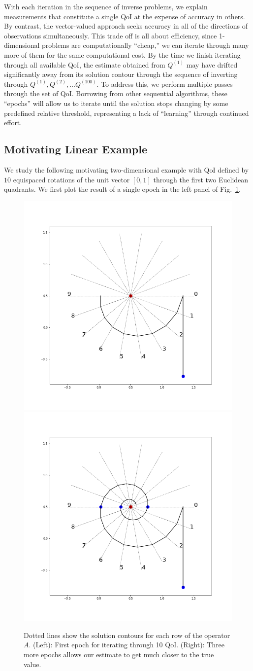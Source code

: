 With each iteration in the sequence of inverse problems, we explain measurements that constitute a single QoI at the expense of accuracy in others.
By contrast, the vector-valued approach seeks accuracy in all of the directions of observations simultaneously.
This trade off is all about efficiency, since 1-dimensional problems are computationally ``cheap,'' we can iterate through many more of them for the same computational cost.
By the time we finish iterating through all available QoI, the estimate obtained from $Q^{(1)}$ may have drifted significantly away from its solution contour through the sequence of inverting through $Q^{(1)}, Q^{(2)}, \dots Q^{(100)}$.
To address this, we perform multiple passes through the set of QoI.
Borrowing from other sequential algorithms, these ``epochs'' will allow us to iterate until the solution stops changing by some predefined relative threshold, representing a lack of ``learning'' through continued effort.


\subsection{Motivating Linear Example}
We study the following motivating two-dimensional example with QoI defined by $10$ equispaced rotations of the unit vector $[0, 1]$ through the first two Euclidean quadrants.
We first plot the result of a single epoch in the left panel of Fig.~\ref{fig:iterative-linear-demo}.

\begin{figure}
  \centering
  \includegraphics[width=0.475\linewidth]{examples/iterative/10D-firstepoch.png}
  \includegraphics[width=0.475\linewidth]{examples/iterative/10D-fewepochs.png}

  \caption{
  Dotted lines show the solution contours for each row of the operator $A$.
  (Left): First epoch for iterating through 10 QoI.
  (Right): Three more epochs allows our estimate to get much closer to the true value.
  }
  \label{fig:iterative-linear-demo}
\end{figure}

